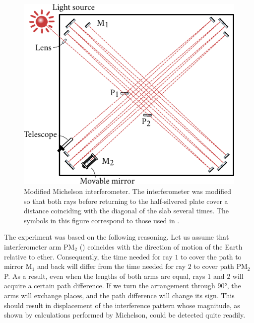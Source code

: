 \begin{figure}[t]
	\begin{center}
		\includegraphics[scale=1]{figures/ch_21/fig_21_5.pdf}
        \caption[]{Modified Michelson interferometer. The interferometer was modified so that both rays before returning to the half-silvered plate cover a distance coinciding with the diagonal of the slab several times. The symbols in this figure correspond to those used in .}
		\label{fig:21_5}
	\end{center}
	\vspace{-0.8cm}
\end{figure}

The experiment was based on the following reasoning. Let us assume that interferometer arm PM$_2$ () coincides with the direction of motion of the Earth relative to ether.
Consequently, the time needed for ray $1$ to cover the path to mirror M$_1$ and back will differ from the time needed for ray $2$ to cover path PM$_2$P.
As a result, even when the lengths of both arms are equal, rays $1$ and $2$ will acquire a certain path difference.
If we turn the arrangement through \ang{90}, the arms will exchange places, and the path difference will change its sign.
This should result in displacement of the interference pattern whose magnitude, as shown by calculations performed by Michelson, could be detected quite readily.


